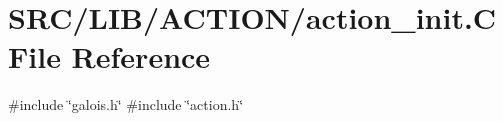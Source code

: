 \hypertarget{action__init_8_c}{}\section{S\+R\+C/\+L\+I\+B/\+A\+C\+T\+I\+O\+N/action\+\_\+init.C File Reference}
\label{action__init_8_c}
{\ttfamily \#include \char`\"{}galois.\+h\char`\"{}}\newline
{\ttfamily \#include \char`\"{}action.\+h\char`\"{}}\newline
